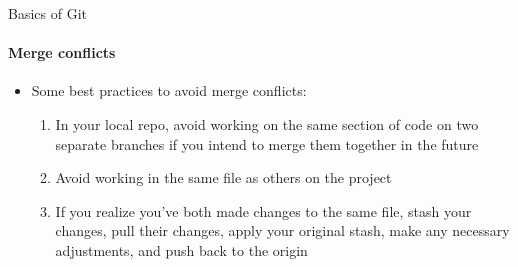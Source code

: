 \documentclass[10pt, aspectratio=169, xcolor=dvipsnames]{beamer}
\let\olditem\item
\renewcommand{\item}{%
\olditem\vspace{0.3em}}
\begin{document}
\begin{frame}[t]{Basics of Git}
    \framesubtitle{Merge conflicts}

    \normalsize\vspace{0.5em}
    \begin{itemize}
        \item Some best practices to avoid merge conflicts: \begin{enumerate}
            \item In your local repo, avoid working on the same section of code on two separate branches if you intend to merge them together in the future
            \item Avoid working in the same file as others on the project
            \item If you realize you've both made changes to the same file, stash your changes, pull their changes, apply your original stash, make any necessary adjustments, and push back to the origin
        \end{enumerate}
    \end{itemize}
\end{frame}
\end{document}
